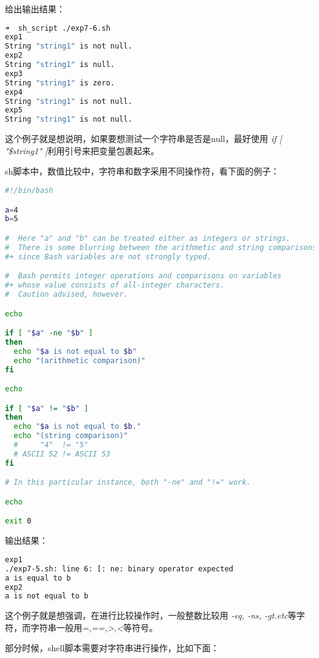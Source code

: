 \documentclass[12pt]{article}  %
\begin{document}
给出输出结果：
\begin{lstlisting}[language=sh]
➜  sh_script ./exp7-6.sh
exp1
String "string1" is not null.
exp2
String "string1" is null.
exp3
String "string1" is zero.
exp4
String "string1" is not null.
exp5
String "string1" is not null.

\end{lstlisting}\par
这个例子就是想说明，如果要想测试一个字符串是否是null，最好使用 \emph{if [ "\$string1" ]}利用引号来把变量包裹起来。\par
sh脚本中，数值比较中，字符串和数字采用不同操作符，看下面的例子：
\begin{lstlisting}[language=sh]
#!/bin/bash

a=4
b=5

#  Here "a" and "b" can be treated either as integers or strings.
#  There is some blurring between the arithmetic and string comparisons,
#+ since Bash variables are not strongly typed.

#  Bash permits integer operations and comparisons on variables
#+ whose value consists of all-integer characters.
#  Caution advised, however.

echo

if [ "$a" -ne "$b" ]
then
  echo "$a is not equal to $b"
  echo "(arithmetic comparison)"
fi

echo

if [ "$a" != "$b" ]
then
  echo "$a is not equal to $b."
  echo "(string comparison)"
  #     "4"  != "5"
  # ASCII 52 != ASCII 53
fi

# In this particular instance, both "-ne" and "!=" work.

echo

exit 0
\end{lstlisting}\par
输出结果：
\begin{lstlisting}[language=sh]
exp1
./exp7-5.sh: line 6: [: ne: binary operator expected
a is equal to b
exp2
a is not equal to b

\end{lstlisting}\par
这个例子就是想强调，在进行比较操作时，一般整数比较用 \emph{-eq, -ns, -gt.etc}等字符，而字符串一般用\emph{=,==,>,<}等符号。\par
部分时候，shell脚本需要对字符串进行操作，比如下面：
\end{document}
